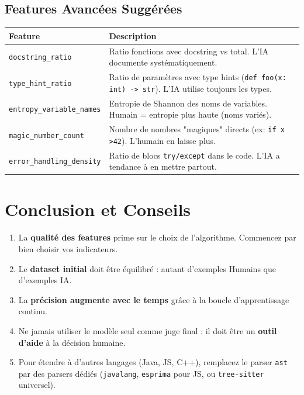 \documentclass[a4paper,11pt]{article}
\begin{document}
\subsection{Features Avancées Suggérées}
\begin{center}
\begin{tabular}{|p{5cm}|p{9cm}|}
\hline
\textbf{Feature} & \textbf{Description} \\
\hline
\texttt{docstring\_ratio} & Ratio fonctions avec docstring vs total. L'IA documente systématiquement. \\
\hline
\texttt{type\_hint\_ratio} & Ratio de paramètres avec type hints (\texttt{def foo(x: int) -> str}). L'IA utilise toujours les types. \\
\hline
\texttt{entropy\_variable\_names} & Entropie de Shannon des noms de variables. Humain = entropie plus haute (noms variés). \\
\hline
\texttt{magic\_number\_count} & Nombre de nombres "magiques" directs (ex: \texttt{if x \textgreater 42}). L'humain en laisse plus. \\
\hline
\texttt{error\_handling\_density} & Ratio de blocs \texttt{try/except} dans le code. L'IA a tendance à en mettre partout. \\
\hline
\end{tabular}
\end{center}


\section{Conclusion et Conseils}

\begin{tcolorbox}[colback=primary!5!white, colframe=primary, title=\textbf{Points Clés à Retenir}]
\begin{enumerate}
    \item La \textbf{qualité des features} prime sur le choix de l'algorithme. Commencez par bien choisir vos indicateurs.
    \item Le \textbf{dataset initial} doit être équilibré : autant d'exemples Humains que d'exemples IA.
    \item La \textbf{précision augmente avec le temps} grâce à la boucle d'apprentissage continu.
    \item Ne jamais utiliser le modèle seul comme juge final : il doit être un \textbf{outil d'aide} à la décision humaine.
    \item Pour étendre à d'autres langages (Java, JS, C++), remplacez le parser \texttt{ast} par des parsers dédiés (\texttt{javalang}, \texttt{esprima} pour JS, ou \texttt{tree-sitter} universel).
\end{enumerate}
\end{tcolorbox}
\end{document}
